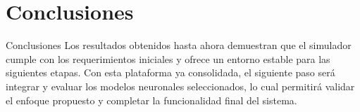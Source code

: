 \section{Conclusiones}

\begin{frame}{Conclusiones}
	Los resultados obtenidos hasta ahora demuestran que el simulador cumple con los requerimientos iniciales y ofrece un entorno estable para las siguientes etapas. Con esta plataforma ya consolidada, el siguiente paso será integrar y evaluar los modelos neuronales seleccionados, lo cual permitirá validar el enfoque propuesto y completar la funcionalidad final del sistema.
\end{frame}

